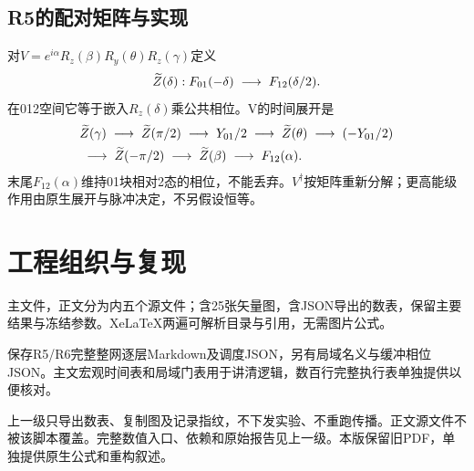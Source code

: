 \subsection{R5的配对矩阵与实现}

对$V=e^{i\alpha}R_z(\beta)R_y(\theta)R_z(\gamma)$定义
\begin{equation}
 \widetilde Z(\delta):F_{01}(-\delta)\;\longrightarrow\; F_{12}(\delta/2).
\end{equation}
在012空间它等于嵌入$R_z(\delta)$乘公共相位。V的时间展开是
\begin{equation}
\begin{aligned}
 &\widetilde Z(\gamma)\;\longrightarrow\;\widetilde Z(\pi/2)\;\longrightarrow\; Y_{01}/2\;\longrightarrow\;\widetilde Z(\theta)
 \;\longrightarrow\;(-Y_{01}/2)\\
 &\;\longrightarrow\;\widetilde Z(-\pi/2)\;\longrightarrow\;\widetilde Z(\beta)\;\longrightarrow\; F_{12}(\alpha).
\end{aligned}
\end{equation}
末尾$F_{12}(\alpha)$维持01块相对2态的相位，不能丢弃。$V^\dagger$按矩阵重新分解；更高能级作用由原生展开与脉冲决定，不另假设恒等。




\clearpage
\clearpage
\clearpage
\clearpage

\section{工程组织与复现}\label{app:reproduce}
主文件，正文分为内五个源文件；含25张矢量图，含JSON导出的数表，保留主要结果与冻结参数。XeLaTeX两遍可解析目录与引用，无需图片公式。

保存R5/R6完整整网逐层Markdown及调度JSON，另有局域名义与缓冲相位JSON。主文宏观时间表和局域门表用于讲清逻辑，数百行完整执行表单独提供以便核对。

上一级只导出数表、复制图及记录指纹，不下发实验、不重跑传播。正文源文件不被该脚本覆盖。完整数值入口、依赖和原始报告见上一级。本版保留旧PDF，单独提供原生公式和重构叙述。

